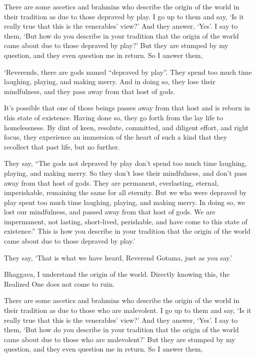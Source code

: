 \documentclass[12pt,openany]{book}%
\begin{document}
There are some ascetics and brahmins who describe the origin of the world in their tradition as due to those depraved by play. I go up to them and say, ‘Is it really true that this is the venerables’ view?’ And they answer, ‘Yes’. I say to them, ‘But how do you describe in your tradition that the origin of the world came about due to those depraved by play?’ But they are stumped by my question, and they even question me in return. So I answer them, 

‘Reverends, there are gods named “depraved by play”. They spend too much time laughing, playing, and making merry. And in doing so, they lose their mindfulness, and they pass away from that host of gods. 

It’s possible that one of those beings passes away from that host and is reborn in this state of existence. Having done so, they go forth from the lay life to homelessness. By dint of keen, resolute, committed, and diligent effort, and right focus, they experience an immersion of the heart of such a kind that they recollect that past life, but no further. 

They say, “The gods not depraved by play don’t spend too much time laughing, playing, and making merry. So they don’t lose their mindfulness, and don’t pass away from that host of gods. They are permanent, everlasting, eternal, imperishable, remaining the same for all eternity. But we who were depraved by play spent too much time laughing, playing, and making merry. In doing so, we lost our mindfulness, and passed away from that host of gods. We are impermanent, not lasting, short-lived, perishable, and have come to this state of existence.” This is how you describe in your tradition that the origin of the world came about due to those depraved by play.’ 

They say, ‘That is what we have heard, Reverend Gotama, just as you say.’ 

Bhaggava, I understand the origin of the world. Directly knowing this, the Realized One does not come to ruin. 

There are some ascetics and brahmins who describe the origin of the world in their tradition as due to those who are malevolent. I go up to them and say, ‘Is it really true that this is the venerables’ view?’ And they answer, ‘Yes’. I say to them, ‘But how do you describe in your tradition that the origin of the world came about due to those who are malevolent?’ But they are stumped by my question, and they even question me in return. So I answer them, 
\end{document}
